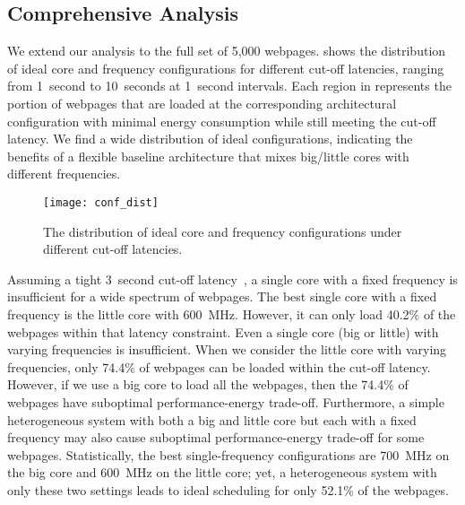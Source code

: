 \subsection{Comprehensive Analysis}
\label{sec:runtime:char:comprehensive}

We extend our analysis to the full set of 5,000 webpages.  shows the distribution of ideal core and frequency configurations for different cut-off latencies, ranging from 1~second to 10~seconds at 1~second intervals. Each region in  represents the portion of webpages that are loaded at the corresponding architectural configuration with minimal energy consumption while still meeting the cut-off latency. We find a wide distribution of ideal configurations, indicating the benefits of a flexible baseline architecture that mixes big/little cores with different frequencies. 

\begin{figure}[t]
\centering
\texttt{[image: conf\_dist]}
\caption{\small{The distribution of ideal core and frequency configurations under different cut-off latencies.}}
\label{fig:conf-dist}
\end{figure}

Assuming a tight 3~second cut-off latency~\cite{ThreeSecond}, a single core with a fixed frequency is insufficient for a wide spectrum of webpages.  The best single core with a fixed frequency is the little core with 600~MHz.  However, it can only load 40.2\% of the webpages within that latency constraint. Even a single core (big or little) with varying frequencies is insufficient. When we consider the little core with varying frequencies, only 74.4\% of webpages can be loaded within the cut-off latency. However, if we use a big core to load all the webpages, then the 74.4\% of webpages have suboptimal performance-energy trade-off. Furthermore, a simple heterogeneous system with both a big and little core but each with a fixed frequency may also cause suboptimal performance-energy trade-off for some webpages. Statistically, the best single-frequency configurations are 700~MHz on the big core and 600~MHz on the little core; yet, a heterogeneous system with only these two settings leads to ideal scheduling for only 52.1\% of the webpages.

